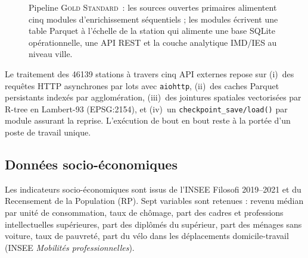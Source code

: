 \documentclass[11pt,a4paper]{article}
\newcommand{\GS}{\textsc{Gold Standard}\xspace}
\begin{document}
\begin{figure}[H]
\caption{Pipeline \GS\ : les sources ouvertes primaires
alimentent cinq modules d'enrichissement séquentiels ; les
modules écrivent une table Parquet à l'échelle de la station
qui alimente une base SQLite opérationnelle, une API REST et
la couche analytique IMD/IES au niveau ville.}
\label{fig:pipeline-dag}
\end{figure}

Le traitement des \num{46139} stations à travers cinq API
externes repose sur (i)~des requêtes HTTP asynchrones par lots
avec \texttt{aiohttp}, (ii)~des caches Parquet persistants
indexés par agglomération, (iii)~des jointures spatiales
vectorisées par R-tree en Lambert-93 (EPSG:2154), et (iv)~un
\texttt{checkpoint\_save/load()} par module assurant la
reprise. L'exécution de bout en bout reste à la portée d'un
poste de travail unique.

\subsection{Données socio-économiques}

Les indicateurs socio-économiques sont issus de l'INSEE Filosofi
2019--2021 et du Recensement de la Population (RP). Sept
variables sont retenues : revenu médian par unité de
consommation, taux de chômage, part des cadres et professions
intellectuelles supérieures, part des diplômés du supérieur,
part des ménages sans voiture, taux de pauvreté, part du vélo
dans les déplacements domicile-travail (INSEE
\emph{Mobilités professionnelles}).
\end{document}
